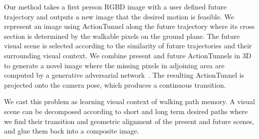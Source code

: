 \documentclass[10pt,twocolumn,letterpaper]{article}
\begin{document}
Our method takes a first person RGBD image with a user defined future trajectory and outputs a new image that the desired motion is feasible. We represent an image using ActionTunnel along the future trajectory where its cross section is determined by the walkable pixels on the ground plane. The future visual scene is selected according to the similarity of future trajectories and their surrounding visual context. We combine present and future ActionTunnels in 3D to generate a novel image where the missing pixels in adjoining area are computed by a generative adversarial network~\cite{goodfellow:2014}. The resulting ActionTunnel is projected onto the camera pose, which produces a continuous transition.



We cast this problem as learning visual context of walking path memory. A visual scene can be decomposed according to short and long term desired paths where we find their transition and geometric alignment of the present and future scenes, and glue them back into a composite image. 


 
 

 



\end{document}
